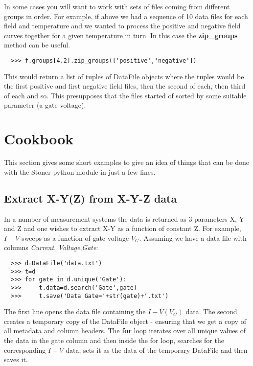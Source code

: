\documentclass[a4paper,11pt]{scrartcl}
\begin{document}
In some cases you will want to work with sets of files coming from different groups in order. For example, if above we had a sequence of 10 data files for each field and temperature and we wanted to process the positive and negative field curves together for a given temperature in turn. In this case the \textbf{zip\_groups} method can be useful.

\begin{verbatim}
  >>> f.groups[4.2].zip_groups(['positive','negative'])
\end{verbatim}

This would return a list of tuples of DataFile objects where the tuples would be the first positive and first negative field files, then the second of each, then third of each and so. This presupposes that the files started of sorted by some suitable parameter (\eg a gate voltage).



\section{Cookbook}

This section gives some short examples to give an idea of things that can be
done with the Stoner python module in just a few lines.

\subsection{Extract X-Y(Z) from X-Y-Z data}

In a number of measurement systems the data is returned as 3 parameters X, Y and
Z and one wishes to extract X-Y as a function of constant Z. For example, $I-V$
sweeps as a function of gate voltage $V_G$. Assuming we have a data file with
columns \textit{Current}, \textit{Voltage},\textit{Gate}:

\begin{verbatim}
  >>> d=DataFile('data.txt')
  >>> t=d
  >>> for gate in d.unique('Gate'):
  >>>     t.data=d.search('Gate',gate)
  >>>     t.save('Data Gate='+str(gate)+'.txt')
\end{verbatim}

The first line opens the data file containing the $I-V(V_G)$ data. The second
creates a temporary copy of the DataFile object - ensuring that we get a copy of
all metadata and column headers. The \textbf{for} loop iterates over all unique
values of the data in the gate column and then inside the for loop, searches for
the corresponding $I-V$ data, sets it as the data of the temporary DataFile and
then saves it.
\end{document}
